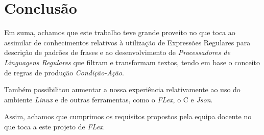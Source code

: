 \documentclass[a4paper,12pt]{report}
\begin{document}
\chapter{Conclusão}

Em suma, achamos que este trabalho teve grande proveito no que toca ao assimilar de conhecimentos relativos à utilização de Expressões Regulares para descrição de padrões de frases e ao desenvolvimento de \textit{Processadores de Linguagens Regulares} que filtram e transformam textos, tendo em base o conceito de regras de produção \textit{Condição-Ação}.
\par Também possibilitou aumentar a nossa experiência relativamente ao uso do ambiente \textit{Linux} e de outras ferramentas, como o \textit{FLex}, o C e \textit{Json}.
\par Assim, achamos que cumprimos os requisitos propostos pela equipa docente no que toca a este projeto de \textit{FLex}.
\end{document}
